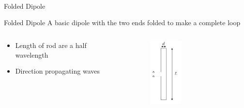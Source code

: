 \documentclass{beamer}
\begin{document}
\begin{frame}{Folded Dipole}
 \begin{block}{Folded Dipole}
 A basic dipole with the two ends folded to make a complete loop
    \end{block}
\begin{columns}[T]
    \begin{column}{.5\textwidth}
\begin{itemize} 
\item	Length of rod are a half wavelength
\item	Direction propagating waves
\end{itemize}
\begin{figure}
\cite{figure_Waveprop}
\end{figure}
    \end{column}
    \begin{column}{.5\textwidth}    
\begin{figure}
\includegraphics[width=0.4\textwidth]{folded.jpg}
\cite{folded}
\end{figure}
    
    \end{column}
  \end{columns}
\end{frame}
\end{document}
